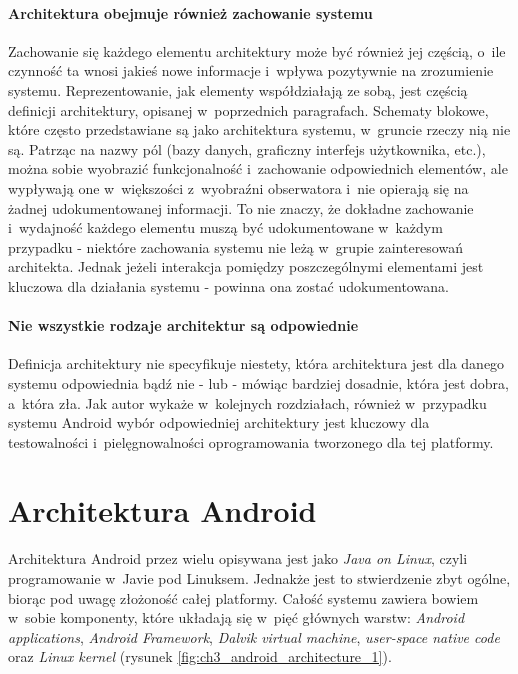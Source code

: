 \paragraph{Architektura obejmuje również zachowanie systemu\newline\newline}
Zachowanie się każdego elementu architektury może być również jej częścią, o~ile czynność ta wnosi jakieś nowe informacje i~wpływa pozytywnie na zrozumienie systemu. Reprezentowanie, jak elementy współdziałają ze sobą, jest częścią definicji architektury, opisanej w~poprzednich paragrafach. Schematy blokowe, które często przedstawiane są jako architektura systemu, w~gruncie rzeczy nią nie są. Patrząc na nazwy pól (bazy danych, graficzny interfejs użytkownika, etc.), można sobie wyobrazić funkcjonalność i~zachowanie odpowiednich elementów, ale wypływają one w~większości z~wyobraźni obserwatora i~nie opierają się na żadnej udokumentowanej informacji. To nie znaczy, że dokładne zachowanie i~wydajność każdego elementu muszą być udokumentowane w~każdym przypadku - niektóre zachowania systemu nie leżą w~grupie zainteresowań architekta. Jednak jeżeli interakcja pomiędzy poszczególnymi elementami jest kluczowa dla działania systemu - powinna ona zostać udokumentowana.

\paragraph{Nie wszystkie rodzaje architektur są odpowiednie\newline\newline}
Definicja architektury nie specyfikuje niestety, która architektura jest dla danego systemu odpowiednia bądź nie - lub - mówiąc bardziej dosadnie, która jest dobra, a~która zła. Jak autor wykaże w~kolejnych rozdziałach, również w~przypadku systemu Android wybór odpowiedniej architektury jest kluczowy dla testowalności i~pielęgnowalności  oprogramowania tworzonego dla tej platformy.

\section{Architektura Android}
Architektura Android przez wielu opisywana jest jako \textit{Java on Linux}, czyli programowanie w~Javie pod Linuksem. Jednakże jest to stwierdzenie zbyt ogólne, biorąc pod uwagę złożoność całej platformy. Całość systemu zawiera bowiem w~sobie komponenty, które układają się w~pięć głównych warstw: \textit{Android applications}, \textit{Android Framework}, \textit{Dalvik virtual machine}, \textit{user-space native code} oraz \textit{Linux kernel}\cite{bib:hacker:handbook} (rysunek \ref{fig:ch3_android_architecture_1}).

